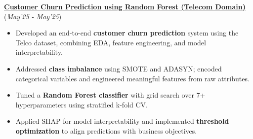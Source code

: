 \documentclass[9pt,a4paper]{extarticle}
\begin{document}
\begin{tcolorbox}[colback=gray!15,height = 5.7mm, width=20.00cm]
\href{https://github.com/suchith83/Churn-Prediction}{\textbf{ Customer Churn Prediction using Random Forest (Telecom Domain)} \large\faGithub} \hfill\hfill(\textit{May'25 - May'25})
\end{tcolorbox}
\vspace{-0.2cm}
\begin{itemize}
\item Developed an end-to-end \textbf{customer churn prediction} system using the Telco dataset, combining EDA, feature engineering, and model interpretability.
\item Addressed \textbf{class imbalance} using SMOTE and ADASYN; encoded categorical variables and engineered meaningful features from raw attributes.
\item Tuned a \textbf{Random Forest classifier} with grid search over 7+ hyperparameters using stratified k-fold CV.
\item Applied SHAP for model interpretability and implemented \textbf{threshold optimization} to align predictions with business objectives.
\end{itemize}

\vspace{-0.1cm}
\end{document}
